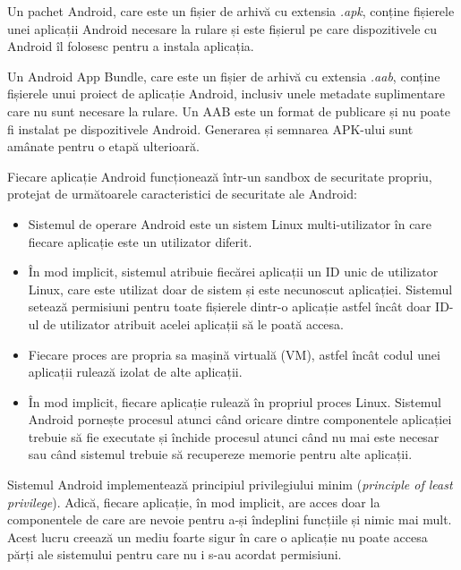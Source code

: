 \documentclass[12pt,a4paper]{report}
\begin{document}
Un pachet Android, care este un fișier de arhivă cu extensia \textit{.apk}, 
conține fișierele unei aplicații Android necesare la rulare și este fișierul pe care dispozitivele cu Android îl folosesc pentru a instala aplicația.\cite{android-application-fundamentals}

Un Android App Bundle, care este un fișier de arhivă cu extensia \textit{.aab}, 
conține fișierele unui proiect de aplicație Android, inclusiv unele metadate suplimentare care nu sunt necesare la rulare. 
Un AAB este un format de publicare și nu poate fi instalat pe dispozitivele Android. 
Generarea și semnarea APK-ului sunt amânate pentru o etapă ulterioară.\cite{android-application-fundamentals}

Fiecare aplicație Android funcționează într-un sandbox de securitate propriu, protejat de următoarele caracteristici de securitate ale Android\cite{android-application-fundamentals}:
\begin{itemize}
    \item Sistemul de operare Android este un sistem Linux multi-utilizator în care fiecare aplicație este un utilizator diferit.
    \item În mod implicit, sistemul atribuie fiecărei aplicații un ID unic de utilizator Linux, care este utilizat doar de sistem și este necunoscut aplicației. Sistemul setează permisiuni pentru toate fișierele dintr-o aplicație astfel încât doar ID-ul de utilizator atribuit acelei aplicații să le poată accesa.
    \item Fiecare proces are propria sa mașină virtuală (VM), astfel încât codul unei aplicații rulează izolat de alte aplicații.
    \item În mod implicit, fiecare aplicație rulează în propriul proces Linux. Sistemul Android pornește procesul atunci când oricare dintre componentele aplicației trebuie să fie executate și închide procesul atunci când nu mai este necesar sau când sistemul trebuie să recupereze memorie pentru alte aplicații.
\end{itemize}

Sistemul Android implementează principiul privilegiului minim (\textit{principle of least privilege}). 
Adică, fiecare aplicație, în mod implicit, are acces doar la componentele de care are nevoie pentru a-și îndeplini funcțiile și nimic mai mult. 
Acest lucru creează un mediu foarte sigur în care o aplicație nu poate accesa părți ale sistemului pentru care nu i s-au acordat permisiuni.\cite{android-application-fundamentals}
\end{document}

